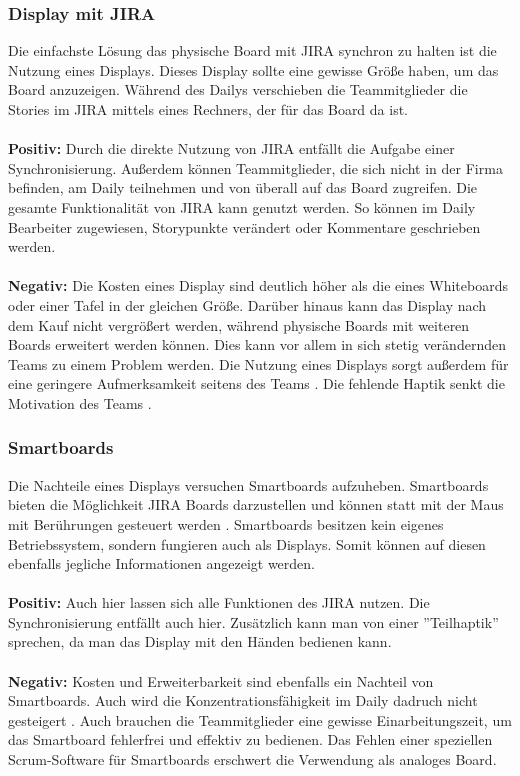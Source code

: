 \documentclass[12pt,titlepage]{scrartcl}
\begin{document}
		\subsubsection{Display mit JIRA}
		Die einfachste Lösung das physische Board mit JIRA synchron zu halten ist die Nutzung eines Displays. Dieses Display sollte eine gewisse Größe haben, um das Board anzuzeigen. Während des Dailys verschieben die Teammitglieder die Stories im JIRA mittels eines Rechners, der für das Board da ist.
		\\ \\
		\textbf{Positiv: }Durch die direkte Nutzung von JIRA entfällt die Aufgabe einer Synchronisierung. Außerdem können Teammitglieder, die sich nicht in der Firma befinden, am Daily teilnehmen und von überall auf das Board zugreifen. Die gesamte Funktionalität von JIRA kann genutzt werden. So können im Daily Bearbeiter zugewiesen, Storypunkte verändert oder Kommentare geschrieben werden.
		\\ \\
		\textbf{Negativ: }Die Kosten eines Display sind deutlich höher als die eines Whiteboards oder einer Tafel in der gleichen Größe. Darüber hinaus kann das Display nach dem Kauf nicht vergrößert werden, während physische Boards mit weiteren Boards erweitert werden können. Dies kann vor allem in sich stetig verändernden Teams zu einem Problem werden. Die Nutzung eines Displays sorgt außerdem für eine geringere Aufmerksamkeit seitens des Teams \cite{pen}. Die fehlende Haptik senkt die Motivation des Teams \cite{progress}. 
		\subsubsection{Smartboards}
		Die Nachteile eines Displays versuchen Smartboards aufzuheben. Smartboards bieten die Möglichkeit JIRA Boards darzustellen und können statt mit der Maus mit Berührungen gesteuert werden \cite{smart}. Smartboards besitzen kein eigenes Betriebssystem, sondern fungieren auch als Displays. Somit können auf diesen ebenfalls jegliche Informationen angezeigt werden.
		\\ \\
		\textbf{Positiv: }Auch hier lassen sich alle Funktionen des JIRA nutzen. Die Synchronisierung entfällt auch hier. Zusätzlich kann man von einer ''Teilhaptik'' sprechen, da man das Display mit den Händen bedienen kann. 
		\\ \\
		\textbf{Negativ: }Kosten und Erweiterbarkeit sind ebenfalls ein Nachteil von Smartboards. Auch wird die Konzentrationsfähigkeit im Daily dadruch nicht gesteigert \cite{pen}. Auch brauchen die Teammitglieder eine gewisse Einarbeitungszeit, um das Smartboard fehlerfrei und effektiv zu bedienen. Das Fehlen einer speziellen Scrum-Software für Smartboards erschwert die Verwendung als analoges Board.
		
\end{document}
